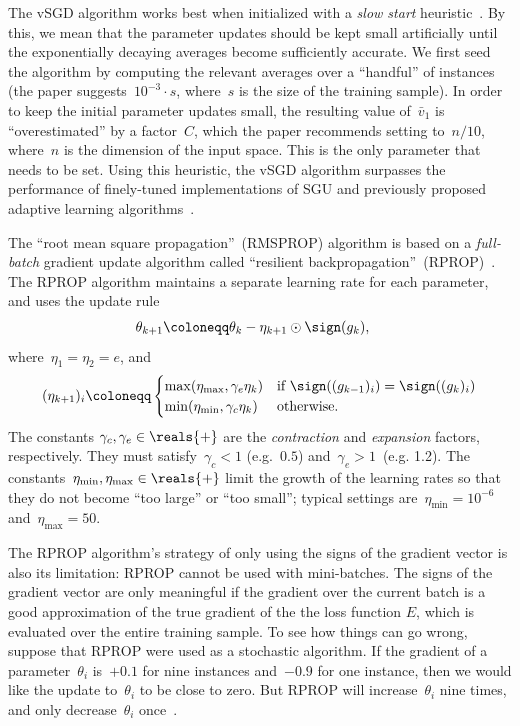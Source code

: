 \documentclass[11pt,a4paper]{article}
\numberwithin{equation}{section}
\begin{document}
The vSGD algorithm works best when initialized with a \emph{slow start}
heuristic~\citep{schaul-icml-13}. By this, we mean that the parameter updates
should be kept small artificially until the exponentially decaying averages
become sufficiently accurate. We first seed the algorithm by computing the
relevant averages over a ``handful'' of instances (the paper suggests~$10^{-3}
\cdot s$, where~$s$ is the size of the training sample). In order to keep the
initial parameter updates small, the resulting value of~$\bar{v}_1$ is
``overestimated'' by a factor~$C$, which the paper recommends setting to~$n /
10$, where~$n$ is the dimension of the input space. This is the only parameter
that needs to be set. Using this heuristic, the vSGD algorithm surpasses the
performance of finely-tuned implementations of SGU and previously proposed
adaptive learning algorithms~\citep{schaul-icml-13}.

The ``root mean square propagation''~(RMSPROP) algorithm is based on a
\emph{full-batch} gradient update algorithm called ``resilient
backpropagation''~(RPROP)~\citep{hinton-nnml-2014}. The RPROP algorithm
maintains a separate learning rate for each parameter, and uses the update rule
\begin{align*}
	\theta_{k + 1} &\coloneqq \theta_k - \eta_{k + 1} \odot \sign(g_k),
\end{align*}
where~$\eta_1 = \eta_2 = e$, and
\[
	(\eta_{k + 1})_i \coloneqq
	\begin{cases} 
	\max(\eta_{\text{max}}, \gamma_e \eta_k) &
		\text{if $\sign((g_{k - 1})_i) = \sign((g_k)_i)$} \\
	\min(\eta_{\text{min}}, \gamma_c \eta_k) & \text{otherwise.}
	\end{cases}
\]
The constants $\gamma_c, \gamma_e \in \reals{+}$ are the \emph{contraction} and
\emph{expansion} factors, respectively. They must satisfy~$\gamma_c < 1$
(e.g.~$0.5$) and~$\gamma_e > 1$~(e.g. 1.2). The constants~$\eta_{\text{min}},
\eta_{\text{max}} \in \reals{+}$ limit the growth of the learning rates so that
they do not become ``too large'' or ``too small''; typical settings
are~$\eta_{\text{min}} = 10^{-6}$ and~$\eta_{\text{max}} = 50$.

The RPROP algorithm's strategy of only using the signs of the gradient vector is
also its limitation: RPROP cannot be used with mini-batches. The signs of the
gradient vector are only meaningful if the gradient over the current batch is a
good approximation of the true gradient of the the loss function $E$, which is
evaluated over the entire training sample. To see how things can go wrong,
suppose that RPROP were used as a stochastic algorithm. If the gradient of a
parameter~$\theta_i$ is~$+0.1$ for nine instances and~$-0.9$ for one instance,
then we would like the update to~$\theta_i$ to be close to zero. But RPROP will
increase~$\theta_i$ nine times, and only decrease~$\theta_i$
once~\citep{hinton-nnml-2014}.
\end{document}
